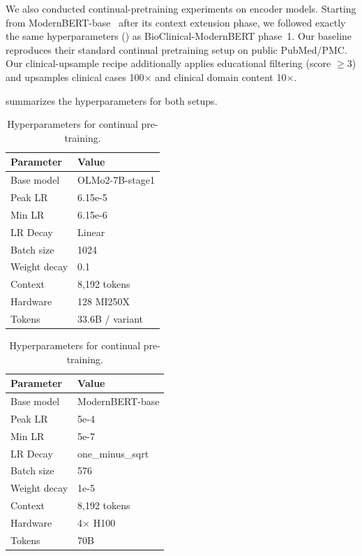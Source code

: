 \begin{reviewread}
We also conducted continual-pretraining experiments on encoder models. Starting from ModernBERT-base~\citep{modernbert} after its context extension phase, we followed exactly the same hyperparameters () as BioClinical-ModernBERT phase~1. Our baseline reproduces their standard continual pretraining setup on public PubMed/PMC. Our clinical-upsample recipe additionally applies educational filtering (score $\geq 3$) and upsamples clinical cases 100$\times$ and clinical domain content 10$\times$.
\end{reviewread}

\begin{reviewread}
 summarizes the hyperparameters for both setups.
\end{reviewread}

\begin{table}[t]
\centering
\small
\begin{minipage}[t]{0.48\textwidth}
\centering
\begin{tabular}{ll}
\toprule
\textbf{Parameter} & \textbf{Value} \\
\midrule
Base model & OLMo2-7B-stage1 \\
Peak LR & 6.15e-5 \\
Min LR & 6.15e-6 \\
LR Decay & Linear \\
Batch size & 1024 \\
Weight decay & 0.1 \\
Context & 8,192 tokens \\
Hardware & 128 MI250X \\
Tokens & 33.6B / variant \\
\bottomrule
\end{tabular}
\label{tab:decoder-hyperparams}
\end{minipage}%
\hfill
\begin{minipage}[t]{0.48\textwidth}
\centering
\begin{tabular}{ll}
\toprule
\textbf{Parameter} & \textbf{Value} \\
\midrule
Base model & ModernBERT-base \\
Peak LR & 5e-4 \\
Min LR & 5e-7 \\
LR Decay & one\_minus\_sqrt \\
Batch size & 576 \\
Weight decay & 1e-5 \\
Context & 8,192 tokens \\
Hardware & 4$\times$ H100 \\
Tokens & 70B \\
\bottomrule
\end{tabular}
\label{tab:encoder-hyperparams}
\end{minipage}
\caption{Hyperparameters for continual pre-training.}
\label{tab:hyperparams}
\end{table}

